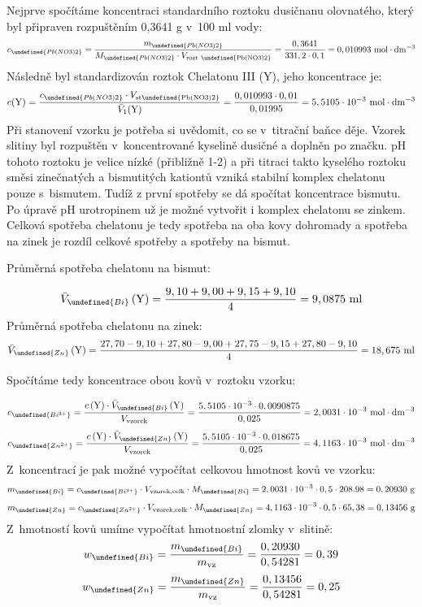 \documentclass{book}
\let\ch\undefined
\begin{document}
Nejprve spočítáme koncentraci standardního roztoku dusičnanu olovnatého,
kte\-rý byl připraven rozpuštěním 0,3641 g v~100 ml vody:
\[
c_{\ch{Pb(NO3)2}}=\frac{m_{\ch{Pb(NO3)2}}}{M_{\ch{Pb(NO3)2}}\cdot V_{\mathrm{rozt\  \ch{Pb(NO3)2}}}}=\frac{0,3641}{331,2\cdot0,1}=0,010993\ \mathrm{mol\cdot dm^{-3}}
\]
Následně byl standardizován roztok Chelatonu III (Y), jeho koncentrace
je: 
\[
c(\mathrm{Y})=\frac{c_{\ch{Pb(NO3)2}}\cdot V_{\mathrm{st \ch{Pb(NO3)2}}}}{\bar{V}_{1}(\mathrm{Y})}=\frac{0,010993\cdot0,01}{0,01995}=5,5105\cdot10^{-3}\ \mathrm{mol\cdot dm^{-3}}
\]
Při stanovení vzorku je potřeba si uvědomit, co se v~titrační baňce
děje. Vzorek slitiny byl rozpuštěn v~koncentrované kyselině dusičné
a doplněn po značku. pH tohoto roztoku je velice nízké (přibližně
1-2) a při titraci takto kyselého roztoku směsi zinečnatých a bismutitých
kationtů vzniká stabilní komplex chelatonu pouze s~bismutem. Tudíž
z první spotřeby se dá spočítat koncentrace bismutu. Po úpravě pH
urotropinem už je možné vytvořit i komplex chelatonu se zinkem. Celková
spotřeba chelatonu je tedy spotřeba na oba kovy dohromady a spotřeba
na zinek je rozdíl celkové spotřeby a spotřeby na bismut. 

\newpage %
Průměrná spotřeba chelatonu na bismut: 

\[
\bar{V}_{\ch{Bi}}\left(\mathrm{Y}\right)=\frac{9,10+9,00+9,15+9,10}{4}=9,0875\ \mathrm{ml}
\]
Průměrná spotřeba chelatonu na zinek: 
\[
\bar{V}_{\ch{Zn}}\left(\mathrm{Y}\right)	=\frac{27,70-9,10+27,80-9,00+27,75-9,15+27,80-9,10}{4}=18,675\ \mathrm{ml}
\]

Spočítáme tedy koncentrace obou kovů v~roztoku vzorku: 

\[
c_{\ch{Bi^{3+}}}=\frac{c\left(\mathrm{Y}\right)\cdot\bar{V}_{\ch{Bi}}\left(\mathrm{Y}\right)}{V_{\mathrm{vzorek}}}=\frac{5,5105\cdot10^{-3}\cdot0,0090875}{0,025}=2,0031\cdot10^{-3}\ \mathrm{mol\cdot dm^{-3}}
\]
\[
c_{\ch{Zn^{2+}}}=\frac{c\left(\mathrm{Y}\right)\cdot\bar{V}_{\ch{Zn}}\left(\mathrm{Y}\right)}{V_{\mathrm{vzorek}}}=\frac{5,5105\cdot10^{-3}\cdot0,018675}{0,025}=4,1163\cdot10^{-3}\ \mathrm{mol\cdot dm^{-3}}
\]
Z~koncentrací je pak možné vypočítat celkovou hmotnost kovů ve vzorku:
\[
m_{\ch{Bi}}=c_{\ch{Bi^{3+}}}\cdot V_{\mathrm{vzorek,celk}}\cdot M_{\ch{Bi}}=2,0031\cdot10^{-3}\cdot0,5\cdot208.98=0,20930\ \mathrm{g}
\]
\[
m_{\ch{Zn}}=c_{\ch{Zn^{2+}}}\cdot V_{\mathrm{vzorek,celk}}\cdot M_{\ch{Zn}}=4,1163\cdot10^{-3}\cdot0,5\cdot65,38=0,13456\ \mathrm{g}
\]
Z~hmotností kovů umíme vypočítat hmotnostní zlomky v~slitině: 
\[
w_{\ch{Bi}}=\frac{m_{\ch{Bi}}}{m_{\mathrm{vz}}}=\frac{0,20930}{0,54281}=0,39
\]
\[
w_{\ch{Zn}}=\frac{m_{\ch{Zn}}}{m_{\mathrm{vz}}}=\frac{0,13456}{0,54281}=0,25
\]
\end{document}
